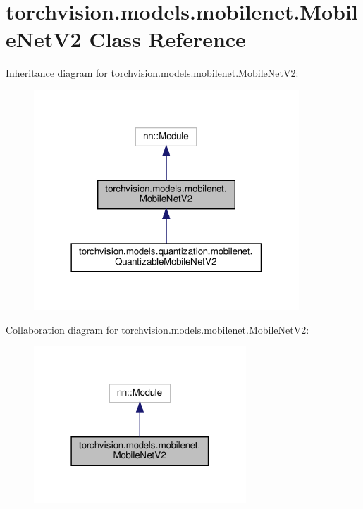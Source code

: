 \hypertarget{classtorchvision_1_1models_1_1mobilenet_1_1MobileNetV2}{}\section{torchvision.\+models.\+mobilenet.\+Mobile\+Net\+V2 Class Reference}
\label{classtorchvision_1_1models_1_1mobilenet_1_1MobileNetV2}


Inheritance diagram for torchvision.\+models.\+mobilenet.\+Mobile\+Net\+V2\+:
\nopagebreak
\begin{figure}[H]
\begin{center}
\leavevmode
\includegraphics[width=282pt]{classtorchvision_1_1models_1_1mobilenet_1_1MobileNetV2__inherit__graph}
\end{center}
\end{figure}


Collaboration diagram for torchvision.\+models.\+mobilenet.\+Mobile\+Net\+V2\+:
\nopagebreak
\begin{figure}[H]
\begin{center}
\leavevmode
\includegraphics[width=226pt]{classtorchvision_1_1models_1_1mobilenet_1_1MobileNetV2__coll__graph}
\end{center}
\end{figure}
